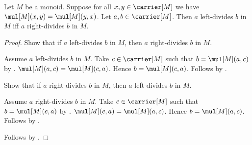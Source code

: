 \begin{theorem}\label{sided_monoid_divisibility_equivalent_if_commutative}
    Let $M$ be a monoid.
    Suppose for all $x,y\in\carrier[M]$ we have
        $\mul[M](x,y)=\mul[M](y,x)$.
    Let $a,b\in\carrier[M]$.
    Then $a$ left-divides $b$ in $M$ iff
        $a$ right-divides $b$ in $M$.
\end{theorem}
\begin{proof}
    Show that if $a$ left-divides $b$ in $M$, then
        $a$ right-divides $b$ in $M$.
    \begin{subproof}
        Assume $a$ left-divides $b$ in $M$.
        Take $c\in\carrier[M]$ such that $b=\mul[M](a,c)$ by
            .
        $\mul[M](a,c)=\mul[M](c,a)$.
        Hence $b=\mul[M](c,a)$.
        Follows by .
    \end{subproof}
    Show that if $a$ right-divides $b$ in $M$, then
        $a$ left-divides $b$ in $M$.
    \begin{subproof}
        Assume $a$ right-divides $b$ in $M$.
        Take $c\in\carrier[M]$ such that $b=\mul[M](c,a)$ by
            .
        $\mul[M](c,a)=\mul[M](a,c)$.
        Hence $b=\mul[M](a,c)$.
        Follows by .
    \end{subproof}
    Follows by \auto.
\end{proof}
